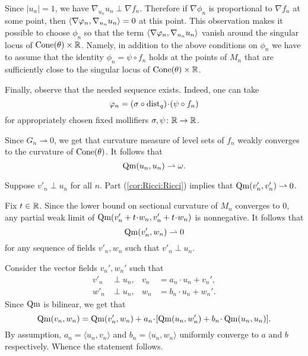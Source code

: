 Since $|u_n|=1$, we have $\nabla_{u_n} u_n\perp \nabla f_n$.
Therefore if $\nabla \phi_n$ is proportional to $\nabla f_n$ at some point, then  $\langle\nabla\varphi_n,\nabla_{u_n} {u_n}\rangle=0$ at this point.
This observation makes it possible to choose $\phi_n$ so that the term $\langle\nabla\varphi_n,\nabla_{u_n} {u_n}\rangle$ vanish around the singular locus of $\operatorname{Cone}(\theta)\times \mathbb{R}$.
Namely, in addition to the above conditions on $\phi_n$ we have to assume that the identity $\phi_n=\psi\circ f_n$ holds at the points of $M_n$ that are sufficiently close to the singular locus of $\operatorname{Cone}(\theta)\times \mathbb{R}$.

Finally, observe that the needed sequence exists.
Indeed, one can take 
\[\phi_n=(\sigma\circ \dist_q)\cdot (\psi\circ f_n)\]
for appropriately chosen fixed mollifiers $\sigma,\psi\colon\mathbb{R}\to \mathbb{R}$.

Since $G_n\rightharpoonup 0$, we get that curvature measure of level sets of $f_n$ weakly converges to the curvature of $\operatorname{Cone}(\theta)$.
It follows that 
\[\operatorname{\rm Qm}(u_n,u_n)\rightharpoonup \omega.\]

Suppose $v'_n\perp u_n$ for all $n$.
Part (\ref{cor:Ricci:Ricci}) implies that  $\Qm(v'_n,v'_n)\zz\rightharpoonup 0$.

Fix $t\in \mathbb{R}$.
Since the lower bound on sectional curvature of $M_n$ converges to $0$, any partial weak limit of $\Qm(v'_n\zz+t\cdot w_n,v'_n\zz+t\cdot w_n)$ is nonnegative.
It follows that 
\[\operatorname{\rm Qm}(v'_n, w_n)\rightharpoonup 0\] for any sequence of fields $v'_n,w_n$ such that $v'_n\perp u_n$.

Consider the vector fields $v_n',w_n'$ such that 
\begin{align*}
v'_n&\perp u_n,
&
v_n&=a_n\cdot u_n+v_n',
\\
w'_n&\perp u_n,
&
w_n&=b_n\cdot u_n+w_n'.
\end{align*}
Since $\operatorname{\rm Qm}$ is bilinear, we get that
\[\Qm(v_n,w_n)=\Qm(v_n',w_n) + a_n\cdot [\Qm(u_n,w_n')+ b_n\cdot \Qm(u_n,u_n)].\]
By assumption, $a_n=\langle u_n,v_n\rangle $ and $b_n=\langle u_n,w_n\rangle$ uniformly converge to $a$ and $b$ respectively.
Whence the statement follows.
\qeds


